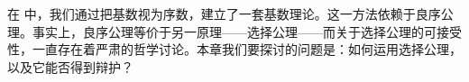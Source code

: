 \documentclass[../../../include/open-logic-section]{subfiles}
\begin{document}


在  中，我们通过把基数视为序数，建立了一套基数理论。这一方法依赖于良序公理。事实上，良序公理等价于另一原理——选择公理——而关于选择公理的可接受性，一直存在着严肃的哲学讨论。本章我们要探讨的问题是：如何运用选择公理，以及它能否得到辩护？
\end{document}
